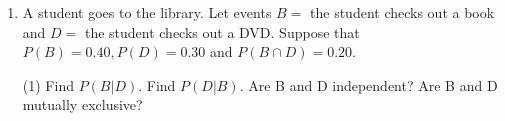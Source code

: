 \begin{enumerate}
Let $G$ be the event where the card drawn is green, and $E$ be the event where the card drawn is even.
\begin{tasks}(1)
\task List the sample space.
\task Find $P(G), P(G|E), P(G \cap E), P(G \cup E)$.
\task Are G and E mutually exclusive? Justify your answer numerically.
\task Are G and E independent? Justify your answer numerically.
\end{tasks}
\vspace{150pt}

\item A student goes to the library. Let events $B =$ the student checks out a book and $D =$ the student checks out a DVD. Suppose that $P(B) = 0.40, P(D) = 0.30$ and $P(B \cap D) = 0.20$.
\begin{tasks}(1)
\task Find $P(B|D)$.
\task Find $P(D|B)$.
\task Are B and D independent?
\task Are B and D mutually exclusive?
\end{tasks}
\end{enumerate}